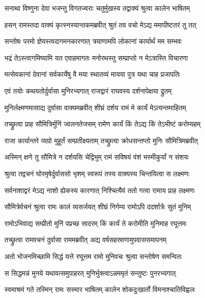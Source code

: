 \twolineshloka
{सनाथा विष्णुना देवा भजन्तु विगतज्वराः}
{चतुर्मुखस्य तद्वाक्यं श्रुत्वा कालेन भाषितम्} %

\twolineshloka
{हसन् रामस्तदा वाक्यं कृत्स्नस्यान्तकमब्रवीत्}
{श्रुतं तव वचो मेऽद्य ममापीष्टतरं तु तत्} %

\twolineshloka
{सन्तोषः परमो ज्ञेयस्त्वदागमनकारणात्}
{त्रयाणामपि लोकानां कार्यार्थं मम सम्भवः} %

\twolineshloka
{भद्रं तेऽस्त्वागमिष्यामि यत एवाहमागतः}
{मनोरथस्तु सम्प्राप्तो न मेऽत्रास्ति विचारणा} %

\twolineshloka
{मत्सेवकानां देवानां सर्वकार्येषु वै मया}
{स्थातव्यं मायया पुत्र यथा चाह प्रजापतिः} %

\twolineshloka
{एवं तयोः कथयतोर्दुर्वासा मुनिरभ्यगात्}
{राजद्वारं राघवस्य दर्शनापेक्षया द्रुतम्} %

\twolineshloka
{मुनिर्लक्ष्मणमासाद्य दुर्वासा वाक्यमब्रवीत्}
{शीघ्रं दर्शय रामं मे कार्यं मेऽत्यन्तमाहितम्} %

\twolineshloka
{तच्छ्रुत्वा प्राह सौमित्रिर्मुनिं ज्वलनतेजसम्}
{रामेण कार्यं किं तेऽद्य किं तेऽभीष्टं करोम्यहम्} %

\twolineshloka
{राजा कार्यान्तरे व्यग्रो मुहूर्तं सम्प्रतीक्ष्यताम्}
{तच्छ्रुत्वा क्रोधसन्तप्तो मुनिः सौमित्रिमब्रवीत्} %

\twolineshloka
{अस्मिन् क्षणे तु सौमित्रे न दर्शयसि चेद्विभुम्}
{रामं सविषयं वंशं भस्मीकुर्यां न संशयः} %

\twolineshloka
{श्रुत्वा तद्वचनं घोरमृषेर्दुर्वाससो भृशम्}
{स्वरूपं तस्य वाक्यस्य चिन्तयित्वा स लक्ष्मणः} %

\twolineshloka
{सर्वनाशाद्वरं मेऽद्य नाशो ह्येकस्य कारणात्}
{निश्चित्यैवं ततो गत्वा रामाय प्राह लक्ष्मणः} %

\twolineshloka
{सौमित्रेर्वचनं श्रुत्वा रामः कालं व्यसर्जयत्}
{शीघ्रं निर्गम्य रामोऽपि ददर्शात्रेः सुतं मुनिम्} %

\twolineshloka
{रामोऽभिवाद्य सम्प्रीतो मुनिं पप्रच्छ सादरम्}
{किं कार्यं ते करोमीति मुनिमाह रघूत्तमः} %

\twolineshloka
{तच्छ्रुत्वा रामवचनं दुर्वासा राममब्रवीत्}
{अद्य वर्षसहस्राणामुपवाससमापनम्} %

\twolineshloka
{अतो भोजनमिच्छामि सिद्धं यत्ते रघूत्तम}
{रामो मुनिवचः श्रुत्वा सन्तोषेण समन्वितः} %

\twolineshloka
{स सिद्धमन्नं मुनये यथावत्समुपाहरत्}
{मुनिर्भुक्त्वाऽन्नममृतं सन्तुष्टः पुनरभ्यगात्} %

\twolineshloka
{स्वमाश्रमं गते तस्मिन् रामः सस्मार भाषितम्}
{कालेन शोकदुःखार्तो विमनाश्चातिविह्वलः} %

